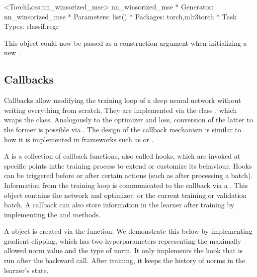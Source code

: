 \documentclass[article]{jss}
\theoremstyle{definition}
\begin{document}
\begin{CodeOutput}
<TorchLoss:nn_winsorized_mse> nn_winsorized_mse
* Generator: nn_winsorized_mse
* Parameters: list()
* Packages: torch,mlr3torch
* Task Types: classif,regr
\end{CodeOutput}

This object could now be passed as a construction argument  when initializing a new .

\subsection{Callbacks}\label{sec:extending-callbacks}

Callbacks allow modifying the training loop of a deep neural network without writing everything from scratch.
They are implemented via the  class , which wraps the  class.
Analogously to the optimizer and loss, conversion of the latter to the former is possible via .
The design of the callback mechanism is similar to how it is implemented in frameworks such as \keras{} or \luz{} \citep{ref-chollet2018keras, ref-luz2023}.

A  is a collection of callback functions, also called hooks, which are invoked at specific points inthe training process to extend or customize its behaviour.
Hooks can be triggered before or after certain actions (such as after processing a batch).
Information from the training loop is communicated to the callback via a .
This object contains the network and optimizer, or the current training or validation batch.
A callback can also store information in the learner after training by implementing the  and  methods.

A  object is created via the  function.
We demonstrate this below by implementing gradient clipping, which has two hyperparameters representing the maximally allowed norm value and the type of norm.
It only implements the hook that is run after the backward call.
After training, it keeps the history of norms in the learner's state.
\end{document}
